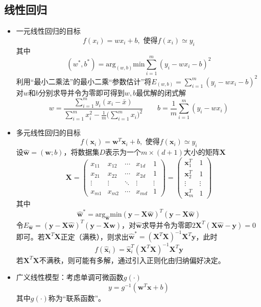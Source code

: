 \documentclass{ctexart}
\begin{document}
				\subsection{线性回归}
					\begin{itemize}
						\item 一元线性回归的目标\[f(x_i)=wx_i+b,\textrm{ 使得}f(x_i)\simeq y_i\]其中\[(w^*,b^*)=\mathrm{arg}_{(w,b)}\mathrm{min}\sum_{i=1}^{m}(y_i-wx_i-b)^2\]利用``最小二乘法''的最小二乘``参数估计''将$E_{(w,b)}=\sum_{i=1}^{m}(y_i-wx_i-b)^2$对$w$和$b$分别求导并令为零即可得到$w,b$最优解的闭式解\[w=\frac{\sum_{i=1}^{m}y_i(x_i-\bar{x})}{\sum_{i=1}^{m}x_i^2-\frac{1}{m}\big(\sum_{i=1}^{m}x_i\big)^2}\mathrm{\qquad}b=\frac{1}{m}\sum_{i=1}^{m}(y_i-wx_i)\]
						\item 多元线性回归的目标\[f(\bm{x}_i)=\bm{w}^T\bm{x}_i+b,\textrm{ 使得}f(\bm{x}_i)\simeq y_i\]设$\hat{\bm{w}}=(\bm{w};b)$，将数据集$D$表示为一个$m\times(d+1)$大小的矩阵$\bm{X}$\[\bm{X}=\left(\begin{matrix}
						x_{11} & x_{12} & \cdots & x_{1d} & 1 \\
						x_{21} & x_{22} & \cdots & x_{2d} & 1 \\
						\vdots & \vdots & \ddots & \vdots & \vdots \\
						x_{m1} & x_{m2} & \cdots & x_{md} & 1
						\end{matrix}\right)=\left(\begin{matrix}
						\bm{x}_1^T & 1 \\
						\bm{x}_2^T & 1 \\
						\vdots & \vdots \\
						\bm{x}_m^T & 1
						\end{matrix}\right)\]其中\[\hat{\bm{w}}^*=\mathrm{arg}_{\hat{\bm{w}}}\mathrm{min}(\bm{y}-\bm{X\hat{w}})^T(\bm{y}-\bm{X\hat{w}})\]令$E_{\hat{\bm{w}}}=(\bm{y}-\bm{X\hat{w}})^T(\bm{y}-\bm{X\hat{w}})$，对$\bm{\hat{w}}$求导并令为零即$2\bm{X}^T(\bm{X\hat{w}}-\bm{y})=0$即可。若$\bm{X}^T\bm{X}$正定（满秩），则求出$\hat{\bm{w}}^*=(\bm{X}^T\bm{X})^{-1}\bm{X}^T\bm{y}$，此时\[f(\hat{\bm{x}}_i)=\hat{\bm{x}}_i^T(\bm{X}^T\bm{X})^{-1}\bm{X}^T\bm{y}\]若$\bm{X}^T\bm{X}$不满秩，则可能有多解，通过引入正则化由归纳偏好决定。
						\item 广义线性模型：考虑单调可微函数$g(\cdot)$\[y=g^{-1}(\bm{w}^T\bm{x}+b)\]其中$g(\cdot)$称为``联系函数''。
					\end{itemize}
\end{document}
